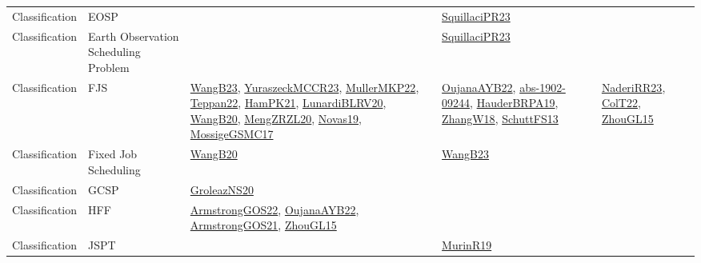 {\begin{longtable}{lp{3cm}>{\raggedright}p{6cm}>{\raggedright}p{6cm}p{8cm}}
Classification & EOSP &  & \href{papers/SquillaciPR23.pdf}{SquillaciPR23}\cite{SquillaciPR23} & \\
Classification & Earth Observation Scheduling Problem &  & \href{papers/SquillaciPR23.pdf}{SquillaciPR23}\cite{SquillaciPR23} & \\
Classification & FJS & \href{papers/WangB23.pdf}{WangB23}\cite{WangB23}, \href{articles/YuraszeckMCCR23.pdf}{YuraszeckMCCR23}\cite{YuraszeckMCCR23}, \href{articles/MullerMKP22.pdf}{MullerMKP22}\cite{MullerMKP22}, \href{papers/Teppan22.pdf}{Teppan22}\cite{Teppan22}, \href{articles/HamPK21.pdf}{HamPK21}\cite{HamPK21}, \href{articles/LunardiBLRV20.pdf}{LunardiBLRV20}\cite{LunardiBLRV20}, \href{papers/WangB20.pdf}{WangB20}\cite{WangB20}, \href{articles/MengZRZL20.pdf}{MengZRZL20}\cite{MengZRZL20}, \href{articles/Novas19.pdf}{Novas19}\cite{Novas19}, \href{papers/MossigeGSMC17.pdf}{MossigeGSMC17}\cite{MossigeGSMC17} & \href{papers/OujanaAYB22.pdf}{OujanaAYB22}\cite{OujanaAYB22}, \href{articles/abs-1902-09244.pdf}{abs-1902-09244}\cite{abs-1902-09244}, \href{articles/HauderBRPA19.pdf}{HauderBRPA19}\cite{HauderBRPA19}, \href{articles/ZhangW18.pdf}{ZhangW18}\cite{ZhangW18}, \href{papers/SchuttFS13.pdf}{SchuttFS13}\cite{SchuttFS13} & \href{articles/NaderiRR23.pdf}{NaderiRR23}\cite{NaderiRR23}, \href{articles/ColT22.pdf}{ColT22}\cite{ColT22}, \href{papers/ZhouGL15.pdf}{ZhouGL15}\cite{ZhouGL15}\\
Classification & Fixed Job Scheduling & \href{papers/WangB20.pdf}{WangB20}\cite{WangB20} & \href{papers/WangB23.pdf}{WangB23}\cite{WangB23} & \\
Classification & GCSP & \href{papers/GroleazNS20.pdf}{GroleazNS20}\cite{GroleazNS20} &  & \\
Classification & HFF & \href{papers/ArmstrongGOS22.pdf}{ArmstrongGOS22}\cite{ArmstrongGOS22}, \href{papers/OujanaAYB22.pdf}{OujanaAYB22}\cite{OujanaAYB22}, \href{papers/ArmstrongGOS21.pdf}{ArmstrongGOS21}\cite{ArmstrongGOS21}, \href{papers/ZhouGL15.pdf}{ZhouGL15}\cite{ZhouGL15} &  & \\
Classification & JSPT &  & \href{papers/MurinR19.pdf}{MurinR19}\cite{MurinR19} & \\

\end{longtable}}
